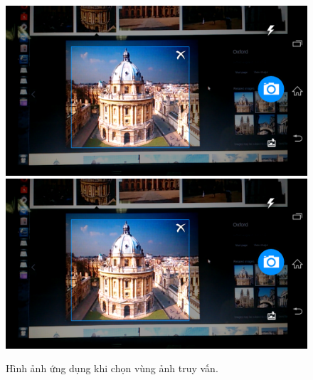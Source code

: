 \begin{figure}[!htbp]
  \begin{center}
    \leavevmode
    \ifpdf
      \includegraphics[scale=0.17]{choose_region}
    \else
      \includegraphics[scale=0.17]{choose_region}
    \fi
    \caption[Hình ảnh ứng dụng khi chọn vùng ảnh truy vấn]{Hình ảnh ứng dụng khi chọn vùng ảnh truy vấn.}
    \label{FigChooseRegion}
  \end{center}
\end{figure}

